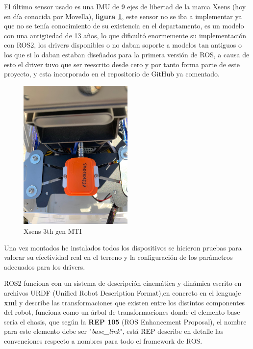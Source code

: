 El último sensor usado es una IMU de 9 ejes de libertad de la marca Xsens (hoy en día conocida por Movella), 
\textbf{figura \ref{fig:xsens_imu}}, este sensor no se iba a implementar ya que no se tenía conocimiento de su existencia en el 
departamento, es un modelo con una antigüedad de 13 años, lo que dificultó enormemente su implementación con ROS2, los drivers 
disponibles o no daban soporte a modelos tan antiguos o los que si lo daban estaban diseñados para la primera versión de ROS, a causa de 
esto el driver tuvo que ser reescrito desde cero y por tanto forma parte de este proyecto, y esta incorporado en el repositorio de GitHub 
ya comentado.  
\begin{figure}[h]
    \centering
    \includegraphics[width=0.5\textwidth]{images/xsens.jpeg}
    \caption{Xsens 3th gen MTI}
    \label{fig:xsens_imu}
\end{figure}

Una vez montados he instalados todos los dispositivos se hicieron pruebas para valorar su efectividad real en el terreno y la configuración 
de los parámetros adecuados para los drivers.

ROS2 funciona con un sistema de descripción cinemática y dinámica escrito en archivos URDF (Unified Robot Description Format),en concreto en 
el lenguaje \textbf{xml} y describe las transformaciones que existen entre los distintos componentes del robot, funciona como un árbol de 
transformaciones donde el elemento base sería el chasis, que según la \textbf{REP 105} (ROS Enhancement Proposal), el nombre para este 
elemento debe ser "\textit{base\_link}", está REP describe en detalle las convenciones respecto a nombres para todo el framework de ROS. 

